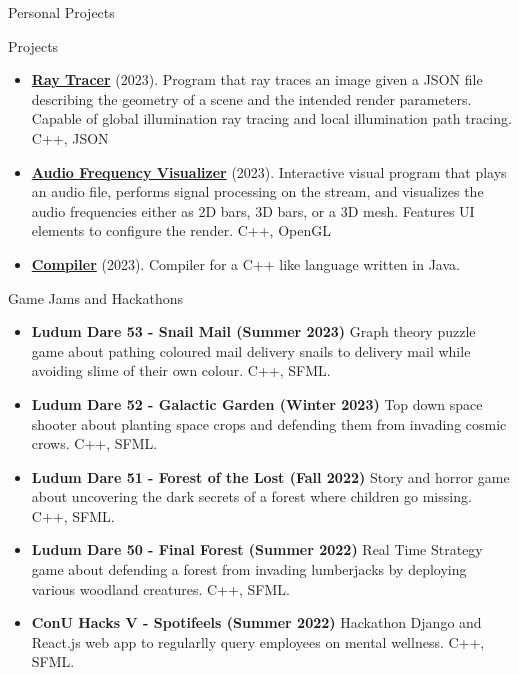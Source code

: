 \documentclass[]{mcdowellcv}
\begin{document}
	\begin{cvsection}{Personal Projects}
		\begin{cvsubsection}{Projects}{}{}
			\begin{itemize}
				\item \textbf{\href{https://github.com/adrientremblay/RayTracer}{Ray Tracer}} (2023). Program that ray traces an image given a JSON file describing the geometry of a scene and the intended render parameters. Capable of global illumination ray tracing and local illumination path tracing. C++, JSON 
                \item \textbf{\href{https://github.com/adrientremblay/AudioVisualizer}{Audio Frequency Visualizer}} (2023). Interactive visual program that plays an audio file, performs signal processing on the stream, and visualizes the audio frequencies either as 2D bars, 3D bars, or a 3D mesh. Features UI elements to configure the render. C++, OpenGL 
                \item \textbf{\href{https://github.com/adrientremblay/Compiler}{Compiler}} (2023). Compiler for a C++ like language written in Java.
			\end{itemize}
		\end{cvsubsection}
	\end{cvsection}
	
	\begin{cvsection}{Game Jams and Hackathons}
		\begin{cvsubsection}{}{}{}	
			\begin{itemize}
				\item \textbf{Ludum Dare 53 - Snail Mail (Summer 2023)} Graph theory puzzle game about pathing coloured mail delivery snails to delivery mail while avoiding slime of their own colour. C++, SFML.
				\item \textbf{Ludum Dare 52 - Galactic Garden (Winter 2023)} Top down space shooter about planting space crops and defending them from invading cosmic crows. C++, SFML.
				\item \textbf{Ludum Dare 51 - Forest of the Lost (Fall 2022)} Story and horror game about uncovering the dark secrets of a forest where children go missing. C++, SFML.
				\item \textbf{Ludum Dare 50 - Final Forest (Summer 2022)} Real Time Strategy game about defending a forest from invading lumberjacks by deploying various woodland creatures. C++, SFML.
				\item \textbf{ConU Hacks V - Spotifeels (Summer 2022)} Hackathon Django and React.js web app to regularlly query employees on mental wellness. C++, SFML.
			\end{itemize}
		\end{cvsubsection}
	\end{cvsection}
	
\end{document}
